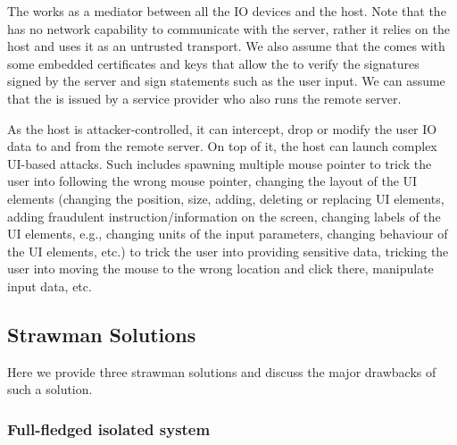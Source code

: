 The \device works as a mediator between all the IO devices and the host. Note that the \device has no network capability to communicate with the server, rather it relies on the host and uses it as an untrusted transport. We also assume that the \device comes with some embedded certificates and keys that allow the \device to verify the signatures signed by the server and sign statements such as the user input. We can assume that the \device is issued by a service provider who also runs the remote server.

 As the host is attacker-controlled, it can intercept, drop or modify the user IO data to and from the remote server. On top of it, the host can launch complex UI-based attacks. Such includes spawning multiple mouse pointer to trick the user into following the wrong mouse pointer, changing the layout of the UI elements (changing the position, size, adding, deleting or replacing UI elements, adding fraudulent instruction/information on the screen, changing labels of the UI elements, e.g., changing units of the input parameters, changing behaviour of the UI elements, etc.) to trick the user into providing sensitive data, tricking the user into moving the mouse to the wrong location and click there, manipulate input data, etc.

\iffalse
\begin{figure}[t]
\centering
\texttt{[image: screenPartition.pdf]}
\caption{\textbf{\device's pointer tracking, pointer \& UI overlay, and security properties.} Our proposed method provides two layers of protection for IO to the user. 1. In all the parts of the screen, the \device provide pointer integrity (the gray part). 2. The green part of the screen where the \device overlays on the HDMI stream where the \device provide integrity and privacy (privacy is dependent on the application requirements) for the IO.}
\spacesave
\label{fig:screenPartition}
\centering
\end{figure}
\fi

\iffalse
\subsection{Strawman Solutions}
\label{sec:approach:strawman}

Here we provide three strawman solutions and discuss the major drawbacks of such a solution.

\subsubsection{\bfseries Full-fledged isolated system}
\label{sec:approach:strawman:1}

